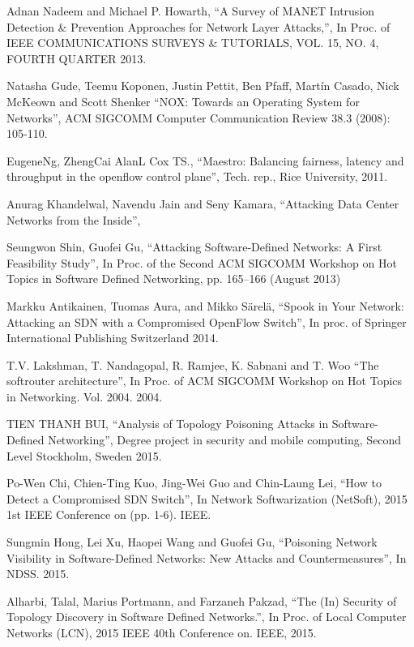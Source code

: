 \begin{thebibliography}{1}
Adnan Nadeem and Michael P. Howarth,
``A Survey of MANET Intrusion Detection \& Prevention Approaches for Network Layer Attacks,'', In Proc. of IEEE COMMUNICATIONS SURVEYS \& TUTORIALS, VOL. 15, NO. 4, FOURTH QUARTER 2013.

Natasha Gude, Teemu Koponen, Justin Pettit, Ben Pfaff, Martín Casado, Nick McKeown and Scott Shenker
``NOX: Towards an Operating System for Networks'', ACM SIGCOMM Computer Communication Review 38.3 (2008): 105-110.

EugeneNg, ZhengCai AlanL Cox TS.,
``Maestro: Balancing fairness, latency and throughput in the openflow control plane'', Tech. rep., Rice University, 2011.

Anurag Khandelwal, Navendu Jain and Seny Kamara,
``Attacking Data Center Networks from the Inside'', 

Seungwon Shin, Guofei Gu, 
``Attacking Software-Defined Networks: A First Feasibility Study'', In Proc. of the Second ACM SIGCOMM Workshop on Hot Topics in Software Defined Networking, pp. 165–166 (August 2013)


Markku Antikainen, Tuomas Aura, and Mikko Särelä,
``Spook in Your Network: Attacking an SDN with a Compromised OpenFlow Switch'', In proc. of Springer International Publishing Switzerland 2014.

T.V. Lakshman, T. Nandagopal, R. Ramjee, K. Sabnani and T. Woo
``The softrouter architecture'', In Proc. of ACM SIGCOMM Workshop on Hot Topics in Networking. Vol. 2004. 2004.

TIEN THANH BUI,
``Analysis of Topology Poisoning Attacks in Software-Defined Networking'', Degree project in security and mobile computing, Second Level Stockholm, Sweden 2015.

Po-Wen Chi, Chien-Ting Kuo, Jing-Wei Guo and Chin-Laung Lei,
``How to Detect a Compromised SDN Switch'', In Network Softwarization (NetSoft), 2015 1st IEEE Conference on (pp. 1-6). IEEE.

Sungmin Hong, Lei Xu, Haopei Wang and Guofei Gu,
``Poisoning Network Visibility in Software-Defined Networks: New Attacks and Countermeasures'', In NDSS. 2015. 

Alharbi, Talal, Marius Portmann, and Farzaneh Pakzad,
``The (In) Security of Topology Discovery in Software Defined Networks.'', In Proc. of Local Computer Networks (LCN), 2015 IEEE 40th Conference on. IEEE, 2015.


\end{thebibliography}
